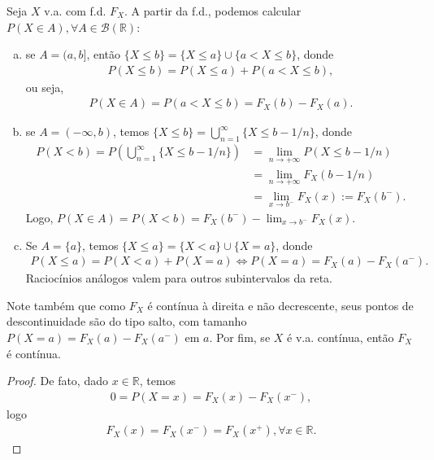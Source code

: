 \documentclass[../Notas.tex]{subfiles}
\begin{document}
\begin{remark}
Seja $X$ v.a. com f.d. $F_X$. A partir da f.d., podemos calcular $P(X\in A), \forall A\in\mathcal{B}(\mathbb{R})$:
\begin{enumerate}[(a)]
    \item se $A = (a,b]$, então $\{X\leq b\} = \{X\leq a\}\cup\{a<X\leq b\}$, donde
    \begin{align*}
        P(X\leq b) = P(X\leq a) + P(a < X\leq b),
    \end{align*}
    ou seja, 
    \begin{align*}
        P(X\in A) = P(a < X\leq b) = F_X(b) - F_X(a).
    \end{align*}
    \item se $A = (-\infty, b)$, temos $\{X\leq b\} = \displaystyle{\bigcup_{n=1}^{\infty}\{ X\leq b - 1/n \} }$, donde
    \begin{align*}
        P(X < b) = P\left( \bigcup_{n=1}^{\infty}\{ X\leq b - 1/n \} \right) &= \lim_{n\to +\infty} P(X\leq b - 1/n) \\
        &= \lim_{n\to +\infty}F_X(b - 1/n) \\
        &= \lim_{x\to b^-}F_X(x) := F_X(b^-).
    \end{align*}
    Logo, $P(X\in A) = P(X < b) = F_X(b^-) - \displaystyle{ \lim_{x\to b^-}F_X(x) }$.
    \item Se $A = \{a\}$, temos $\{ X\leq a \} = \{ X < a \}\cup\{X=a\}$, donde
    \begin{align*}
        P(X\leq a) = P(X<a)+P(X=a) \iff P(X=a) = F_X(a) - F_X(a^-).
    \end{align*}
    Raciocínios análogos valem para outros subintervalos da reta.
\end{enumerate}
Note também que como $F_X$ é contínua à direita e não decrescente, seus pontos de descontinuidade são do tipo salto, com tamanho $P(X=a) = F_X(a) - F_X(a^-)$ em $a$. Por fim, se $X$ é v.a. contínua, então $F_X$ é contínua.
\begin{proof}
De fato, dado $x\in\mathbb{R}$, temos
\begin{align*}
    0 = P(X=x) = F_X(x) - F_X(x^-),
\end{align*}
logo
\begin{align*}
    F_X(x) = F_X(x^-) = F_X(x^+), \forall x\in\mathbb{R}.
\end{align*}
\end{proof}
\end{remark}
\end{document}
